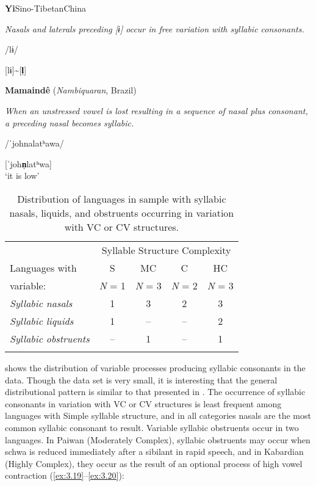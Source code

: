 \ea\label{ex:3.17}
 \textbf{Yi}{Sino-Tibetan}{China}

\textit{Nasals and laterals preceding [ɨ] occur in free variation with syllabic consonants.}

/lɨ/

[lɨ]{\textasciitilde}[\textbf{l̩}]
\citep[31]{Gerner2013}
\z

\ea\label{ex:3.18}
   \textbf{Mamaindê} (\textit{Nambiquaran}, Brazil)

\textit{When an unstressed vowel is lost resulting in a sequence of nasal plus consonant, a preceding nasal becomes syllabic.}

/ˈjohnalatʰawa/

[ˈjoh\textbf{n̩}latʰwa]\\
\glt ‘it is low’
\citep[262-3]{Eberhard2009}
\z

\begin{table}
\begin{tabular}{lcccc}
\lsptoprule
 & \multicolumn{4}{c}{Syllable Structure Complexity}\\\cmidrule(lr){2-5}
 Languages with  & S & MC & C & HC\\
   variable:     &   \textit{N} = 1 & \textit{N} = 3 &  \textit{N} = 2 & \textit{N} = 3\\\midrule
 \textit{Syllabic nasals}     & 1 & 3 & 2 & 3\\
 \textit{Syllabic liquids}    & 1 & -- & -- & 2\\
 \textit{Syllabic obstruents} & -- & 1 & -- & 1\\
\lspbottomrule
\end{tabular}
\caption{\label{tab:3.7}Distribution of languages in sample with syllabic nasals, liquids, and obstruents occurring in variation with VC or CV structures.}
\end{table}

   shows the distribution of variable processes producing syllabic consonants in the data. Though the data set is very small, it is interesting that the general distributional pattern is similar to that presented in . The occurrence of syllabic consonants in variation with VC or CV structures is least frequent among languages with Simple syllable structure, and in all categories nasals are the most common syllabic consonant to result. Variable syllabic obstruents occur in two languages. In Paiwan (Moderately Complex), syllabic obstruents may occur when schwa is reduced immediately after a sibilant in rapid speech, and in Kabardian (Highly Complex), they occur as the result of an optional process of high vowel contraction (\ref{ex:3.19}--\ref{ex:3.20}):


